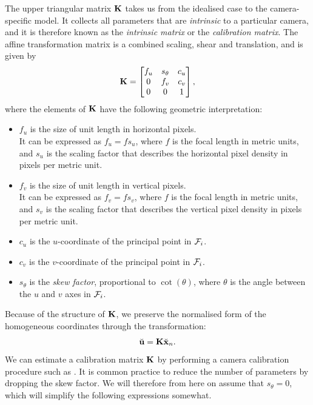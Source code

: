 The upper triangular matrix ${\boldsymbol{\mathbf{K}}}$ takes us from the idealised case to the camera-specific model.
It collects all parameters that are \emph{intrinsic} to a particular camera, and it is therefore known as the \emph{intrinsic matrix} or the \emph{calibration matrix}.
The affine transformation matrix is a combined scaling, shear and translation, and is given by
\begin{equation}
  {\boldsymbol{\mathbf{K}}} = 
  \begin{bmatrix}
    f_u & s_\theta & c_u\\
    0 & f_v & c_v\\
    0 & 0 & 1
  \end{bmatrix},
\end{equation}
where the elements of ${\boldsymbol{\mathbf{K}}}$ have the following geometric interpretation:
\begin{itemize}
  \item $f_u$ is the size of unit length in horizontal pixels.\\
  It can be expressed as $f_u = f s_u$, where $f$ is the focal length in metric units, and $s_u$ is the scaling factor that describes the horizontal pixel density in pixels per metric unit.
  \item $f_v$ is the size of unit length in vertical pixels.\\
  It can be expressed as $f_v = f s_v$, where $f$ is the focal length in metric units, and $s_v$ is the scaling factor that describes the vertical pixel density in pixels per metric unit.
  \item $c_u$ is the $u$-coordinate of the principal point in $\mathcal{F}_i$.
  \item $c_v$ is the $v$-coordinate of the principal point in $\mathcal{F}_i$.
  \item $s_\theta$ is the \emph{skew factor}, proportional to $\cot(\theta)$, where $\theta$ is the angle between the $u$ and $v$ axes in $\mathcal{F}_i$.
\end{itemize}
Because of the structure of ${\boldsymbol{\mathbf{K}}}$, we preserve the normalised form of the homogeneous coordinates through the transformation:
\begin{equation}
  \breve{{\boldsymbol{\mathbf{u}}}} = {\boldsymbol{\mathbf{K}}} \breve{{\boldsymbol{\mathbf{x}}}}_n.
\end{equation}
We can estimate a calibration matrix ${\boldsymbol{\mathbf{K}}}$ by performing a camera calibration procedure such as \cite{Zhang2000ACalibration}.
It is common practice to reduce the number of parameters by dropping the skew factor.
We will therefore from here on assume that $s_\theta=0$, which will simplify the following expressions somewhat.

